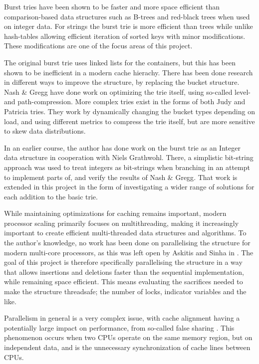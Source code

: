 Burst tries have been shown to be faster and more space efficient than
comparison-based data structures such as B-trees and red-black trees when used
on integer data\cite{Nash:2008}. For strings the burst trie is more efficient
than trees\cite{Heinz:2002} while unlike hash-tables allowing efficient iteration
of sorted keys with minor modifications. These modifications are one of the
focus areas of this project.

The original burst trie\cite{Heinz:2002} uses linked lists for the containers, but this has been
shown to be inefficient in a modern cache hierachy. There has been done research
in different ways to improve the structure, by replacing the bucket structure.
Nash \& Gregg have done work on optimizing the trie itself, using so-called
level- and path-compression\cite{Nash:2008}. More complex tries exist in
the forms of both Judy and Patricia tries. They work by dynamically changing
the bucket types depending on load, and using different metrics to compress
the trie itself, but are more sensitive to skew data distributions.

In an earlier course, the author has done work on the burst trie as an Integer
data structure\cite{Wejendorp:2010} in cooperation with Niels Grathwohl. There,
a simplistic bit-string approach was used to treat integers as bit-strings when
branching in an attempt to implement parts of, and verify the results of Nash
\& Gregg\cite{Nash:2008}. That work is extended in this project in the form of
investigating a wider range of solutions for each addition to the basic trie.

While maintaining optimizations for caching remains important, modern processor
scaling primarily focuses on multithreading, making it increasingly important
to create efficient multi-threaded data structures and algorithms. To the
author's knowledge, no work has been done on parallelising the structure for
modern multi-core processors, as this was left open by Askitis and Sinha in
\cite{Askitis:2010}. The goal of this project is therefore specifically
parallelising the structure in a way that allows insertions and deletions
faster than the sequential implementation, while remaining space
efficient\cite{Askitis:2010}. This means evaluating the sacrifices needed to
make the structure threadsafe; the number of locks, indicator variables and the
like.

Parallelism in general is a very complex issue, with cache alignment having a
potentially large impact on performance, from so-called false sharing
\cite{Shavit:2011}. This phenomenon occurs when two CPUs operate on the same
memory region, but on independent data, and is the unnecessary synchronization
of cache lines between CPUs.

